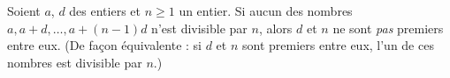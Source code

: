 Soient $a$, $d$ des entiers et $n \geq 1$ un entier. Si aucun des nombres
$a, a + d, \ldots, a + (n-1)d$ n'est divisible par $n$, alors $d$ et $n$ ne
sont \emph{pas} premiers entre eux. (De façon équivalente : si $d$ et $n$ sont
premiers entre eux, l'un de ces nombres est divisible par $n$.)
